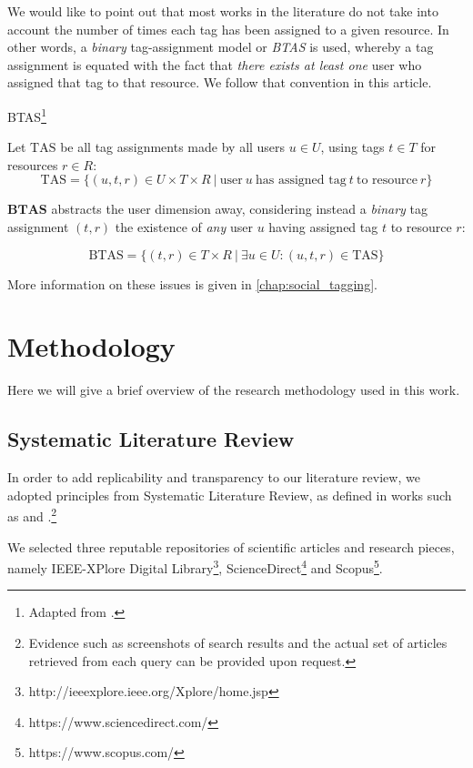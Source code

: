 We would like to point out that most works in the literature do not take into account the number of times each tag has been assigned to a given resource. In other words, a \textit{binary} tag-assignment model or \textit{BTAS} \citep{illig_etal_2011} is used, whereby a tag assignment is equated with the fact that \textit{there exists at least one} user who assigned that tag to that resource. We follow that convention in this article.

\begin{definition}{BTAS}\footnote{Adapted from \cite{illig_etal_2011}.}

Let $\text{TAS}$ be all tag assignments made by all users $u \in U$, using tags $t \in T$ for resources $r \in R$:
\[ \text{TAS} = \{ (u,t,r) \in  U \times T \times R \ | \ \text{user} \ u \ \text{has assigned tag} \ t \ \text{to resource} \ r \} \]  

$\mathbf{BTAS}$ abstracts the user dimension away, considering instead a \textit{binary} tag assignment $(t,r)$ the existence of \textit{any} user $u$ having assigned tag $t$ to resource $r$:

\[ \text{BTAS} = \{(t,r) \in T \times R \ | \ \exists u \in U : (u,t,r) \in \text{TAS} \}  \]

\end{definition}

More information on these issues is given in \autoref{chap:social_tagging}.

\section{Methodology}\label{section:intro_methodology}

Here we will give a brief overview of the research methodology used in this work.

\subsection{Systematic Literature Review}\label{section:literature_review}

In order to add replicability and transparency to our literature review, we adopted principles from Systematic Literature Review, as defined in works such as \cite{baumeister_leary_1997} and \cite{bem_1995}.\footnote{Evidence such as screenshots of search results and the actual set of articles retrieved from each query can be provided upon request.}

We selected three reputable repositories of scientific articles and research pieces, namely IEEE-XPlore Digital Library\footnote{http://ieeexplore.ieee.org/Xplore/home.jsp}, ScienceDirect\footnote{https://www.sciencedirect.com/} and Scopus\footnote{https://www.scopus.com/}.

